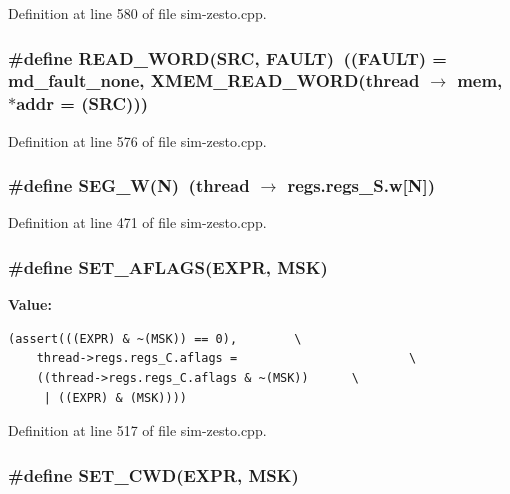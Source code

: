 Definition at line 580 of file sim-zesto.cpp.
\subsubsection[{READ\_\-WORD}]{\setlength{\rightskip}{0pt plus 5cm}\#define READ\_\-WORD(SRC, \/  FAULT)~((FAULT) = md\_\-fault\_\-none, XMEM\_\-READ\_\-WORD(thread $\rightarrow$ mem, $\ast$addr = (SRC)))}\label{sim-zesto_8cpp_6a5dc8a34de59be3e818f3e4e548f6c8}




Definition at line 576 of file sim-zesto.cpp.
\subsubsection[{SEG\_\-W}]{\setlength{\rightskip}{0pt plus 5cm}\#define SEG\_\-W(N)~(thread $\rightarrow$ regs.regs\_\-S.w[N])}\label{sim-zesto_8cpp_a3788cd9050f7482f9bd8ac25e0ecf5b}




Definition at line 471 of file sim-zesto.cpp.
\subsubsection[{SET\_\-AFLAGS}]{\setlength{\rightskip}{0pt plus 5cm}\#define SET\_\-AFLAGS(EXPR, \/  MSK)}\label{sim-zesto_8cpp_c5654cb73f3268e0390e1bd8382c6ad8}


\textbf{Value:}

\begin{Code}\begin{verbatim}(assert(((EXPR) & ~(MSK)) == 0),        \
    thread->regs.regs_C.aflags =                        \
    ((thread->regs.regs_C.aflags & ~(MSK))      \
     | ((EXPR) & (MSK))))
\end{verbatim}
\end{Code}


Definition at line 517 of file sim-zesto.cpp.
\subsubsection[{SET\_\-CWD}]{\setlength{\rightskip}{0pt plus 5cm}\#define SET\_\-CWD(EXPR, \/  MSK)}\label{sim-zesto_8cpp_8071d6de21b945570bfac9589dd49f79}


